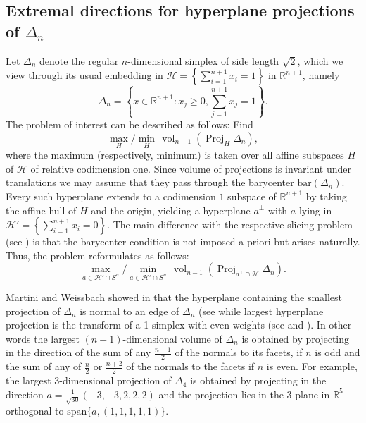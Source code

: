 \documentclass[10pt]{amsart}
\newcommand{\gr}{\geqslant}
\newcommand{\1}{\textbf{1}}
\newcommand{\R}{\mathbb{R}}
\numberwithin{equation}{section} %
\theoremstyle{remark}
\theoremstyle{definition}
\begin{document}
\subsection{Extremal directions for hyperplane projections of $\Delta_n$ }
Let $\Delta_n$ denote the regular $n$-dimensional simplex of side length $\sqrt{2}$, which we view through its usual embedding in $\mathcal{H}=\left \{\sum_{i=1}^{n+1}x_i=1 \right\}$ in $\mathbb{R}^{n+1}$, namely
\[
\Delta_n = \left\{x\in\mathbb{R}^{n+1}: x_j\gr 0, \sum_{j=1}^{n+1}x_j=1\right\}.
\] 
The problem of interest can be described as follows: Find
\[
\max_{H}  /  \min_{H}\, \operatorname{vol}_{n-1}\left(\operatorname{Proj}_{H}\Delta_n \right),
\]
where the maximum (respectively, minimum) is taken over all affine subspaces 
$H$ of $\mathcal{H}$ of relative codimension one. Since volume of projections is invariant under translations we may assume that they pass  through the barycenter $\text{bar}(\Delta_n)$. Every such hyperplane extends to a codimension $1$ subspace of $\mathbb{R}^{n+1}$ by taking the affine hull of $H$ and the origin, yielding a hyperplane $a^{\perp}$ with $a$ lying in $\mathcal{H}'=\left\{\sum_{i=1}^{n+1}x_i=0 \right\}$. The main difference with the respective slicing problem (see \cite{webb1996central}) is that the barycenter condition is not imposed a priori but arises naturally. Thus, the problem reformulates as follows:
\[
\max_{a\in \mathcal{H}'\cap S^{n}}  /  \min_{a\in \mathcal{H}'\cap S^{n}}\, \operatorname{vol}_{n-1}\left(\operatorname{Proj}_{a^{\perp}\cap \mathcal{H}}\Delta_n \right).
\]


Martini and Weissbach showed in \cite{weissbach1984besten} that the hyperplane containing the smallest projection of $\Delta_n$  is normal to an edge of $\Delta_n$  (see \cite[pp. 164-166]{weissbach1984besten} while largest hyperplane projection is the
transform of a 1-simplex with even weights (see \cite[p. 165]{weissbach1984besten} and \cite{filliman1990extreme}). In other words the largest $(n-1)$-dimensional volume of $\Delta_n$  is obtained by projecting in the direction of the sum of any $\frac{n+1}{2}$  of the normals to its facets, if $n$ is odd and the sum of any of $\frac{n}{2}$ or $\frac{n+2}{2}$ of the normals to the facets if $n$ is even. For example, the largest $3$-dimensional projection of  $\Delta_4$ is obtained  by projecting in the direction $a=\frac{1}{\sqrt{30}}\left(-3,-3,2,2,2 \right)$ and the projection lies in the $3$-plane in $\R^5$ orthogonal to $\text{span}\{a,(1,1,1,1,1)\}$. 
\end{document}
